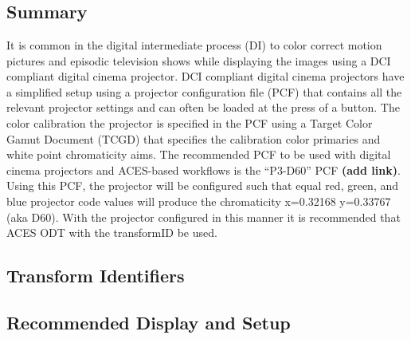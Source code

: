 \section[P3-D60]{\shortName{}}
\label{sec:odt-details-\id}

\subsection{Summary}
\label{subsec:summary-\id}

It is common in the digital intermediate process (DI) to color correct motion pictures and episodic television shows while displaying the images using a DCI compliant digital cinema projector. DCI compliant digital cinema projectors have a simplified setup using a projector configuration file (PCF) that contains all the relevant projector settings and can often be loaded at the press of a button. The color calibration the projector is specified in the PCF using a Target Color Gamut Document (TCGD) that specifies the calibration color primaries and white point chromaticity aims.  The recommended PCF to be used with digital cinema projectors and ACES-based workflows is the ``P3-D60'' PCF \textbf{(add link)}. Using this PCF, the projector will be configured such that equal red, green, and blue projector code values will produce the chromaticity x=0.32168 y=0.33767 (aka D60). With the projector configured in this manner it is recommended that ACES ODT with the transformID \transformID{} be used.

\subsection{Transform Identifiers} 
\label{subsec:odt-ident-\id}

\subsection{Recommended Display and Setup}
\label{subsec:setup-\id}


